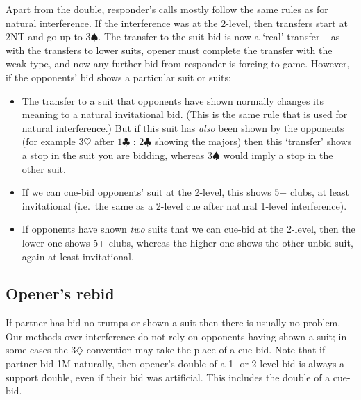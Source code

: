 \documentclass{article}
\newcommand{\sz}{\spadesuit}
\newcommand{\hz}{\heartsuit}
\newcommand{\dz}{\diamondsuit}
\newcommand{\cz}{\clubsuit}
\begin{document}
Apart from the double, responder's calls mostly follow the same rules as for natural interference. If the interference was at the 2-level, then transfers start at 2NT and go up to $3\sz$. The transfer to the suit bid is now a `real' transfer -- as with the transfers to lower suits, opener must complete the transfer with the weak type, and now any further bid from responder is forcing to game. However, if the opponents' bid shows a particular suit or suits:
\begin{itemize}
\item The transfer to a suit that opponents have shown normally changes its meaning to a natural invitational bid. (This is the same rule that is used for natural interference.) But if this suit has \emph{also} been shown by the opponents (for example $3\hz$ after $1\cz$ : $2\cz$ showing the majors) then this `transfer' shows a stop in the suit you are bidding, whereas $3\sz$ would imply a stop in the other suit.
\item If we can cue-bid opponents' suit at the 2-level, this shows 5+ clubs, at least invitational (i.e.~the same as a 2-level cue after natural 1-level interference).
\item If opponents have shown \emph{two} suits that we can cue-bid at the 2-level, then the lower one shows 5+ clubs, whereas the higher one shows the other unbid suit, again at least invitational.
\end{itemize}

\subsection{Opener's rebid}

If partner has bid no-trumps or shown a suit then there is usually no problem. Our methods over interference do not rely on opponents having shown a suit; in some cases the $3\dz$ convention may take the place of a cue-bid. Note that if partner bid 1M naturally, then opener's double of a 1- or 2-level bid is always a support double, even if their bid was artificial. This includes the double of a cue-bid.
\end{document}
